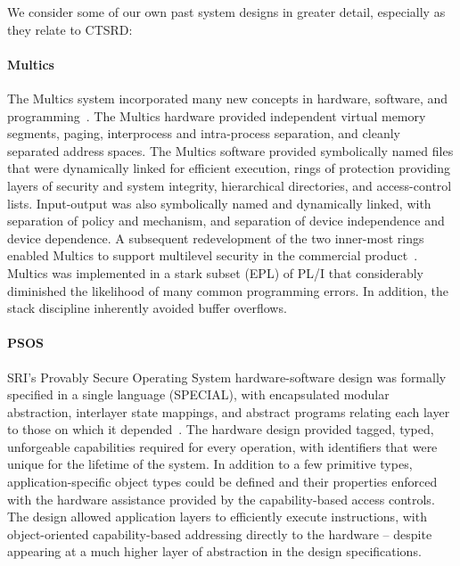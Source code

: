 We consider some of our own past system designs in greater detail,
especially as they relate to CTSRD:

\paragraph{Multics} %
The Multics system incorporated many new concepts in hardware, software,
and programming~\cite{Organick,DaleyNeumann}.
The Multics hardware provided independent virtual
memory segments, paging, interprocess and intra-process separation,
and cleanly separated address spaces.
The Multics software provided
symbolically named files that were dynamically linked for efficient
execution, rings of protection providing layers of security and system
integrity, hierarchical directories, and access-control lists.
Input-output was also symbolically named and dynamically linked, with
separation of policy and mechanism, and separation of device
independence and device dependence.
A subsequent redevelopment of the two
inner-most rings enabled Multics to support multilevel security in the
commercial product~\cite{schroeder:multicssecuritykernel}.
Multics was implemented in a stark subset (EPL) of
PL/I that considerably diminished the likelihood of many common
programming errors.
In addition, the stack discipline inherently
avoided buffer overflows.

\paragraph{PSOS} %
SRI's Provably Secure Operating System hardware-software design was formally
specified in a single language (SPECIAL),
with encapsulated modular abstraction, interlayer state mappings,
and abstract programs relating each layer to those on which it
depended~\cite{PSOS,NeumannFeiertag03}.
The hardware design provided tagged, typed, unforgeable
capabilities required for every operation, with identifiers that were unique
for the lifetime of the system.  In addition to a
few primitive types, application-specific object types could be defined and
their properties enforced with the hardware assistance provided by the
capability-based access controls.  The design allowed application layers to
efficiently execute instructions, with object-oriented
capability-based addressing directly to the hardware -- despite appearing at
a much higher layer of abstraction in the design specifications.

%

